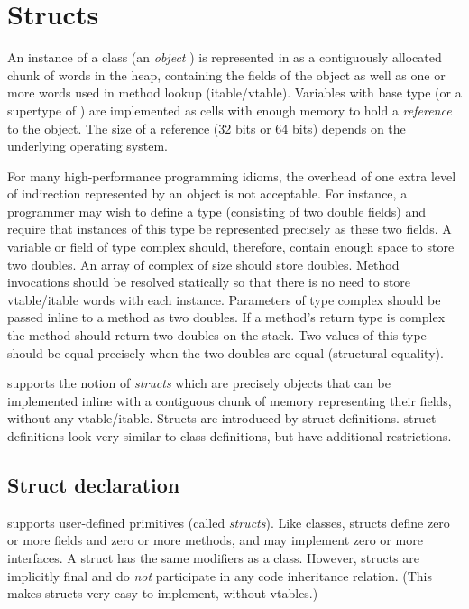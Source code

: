\chapter{Structs}
\label{XtenStructs}
\label{StructClasses}
\label{Structs}

An instance of a class  (an \emph{object} ) is represented in \Xten{} as
a contiguously allocated chunk of words in the heap, containing the
fields of the object as well as one or more words used in method
lookup (itable/vtable). Variables with base type  (or a supertype of
) are implemented as cells with enough memory to hold a
\emph{reference} to the object. The size of a reference (32 bits or 64
bits) depends on the underlying operating system.


For many high-performance programming idioms, the overhead of one
extra level of indirection represented by an object is not
acceptable. For instance, a programmer may wish to define a type
 (consisting of two double fields) and require that instances
of this type be represented precisely as these two fields. A variable
or field of type complex should, therefore, contain enough space to
store two doubles. An array of complex of size  should store 
doubles. Method invocations should be resolved statically so that
there is no need to store vtable/itable words with each
instance. Parameters of type complex should be passed inline to a
method as two doubles. If a method's return type is complex the method
should return two doubles on the stack. Two values of this type should
be equal precisely when the two doubles are equal (structural
equality).

\Xten{} supports the notion of \emph{structs} which are precisely
objects that can be implemented inline with a contiguous chunk of
memory representing their fields, without any vtable/itable. Structs
are introduced by struct definitions. struct definitions look very
similar to class definitions, but have additional restrictions.

\section{Struct declaration}

\Xten{} supports user-defined primitives (called
\emph{structs}). Like classes, structs define zero or more fields and
zero or more methods, and may implement zero or more interfaces. A
struct has the same modifiers as a class. However, structs are
implicitly final and do \emph{not} participate in any code
inheritance relation. (This makes structs very easy to implement,
without vtables.)

